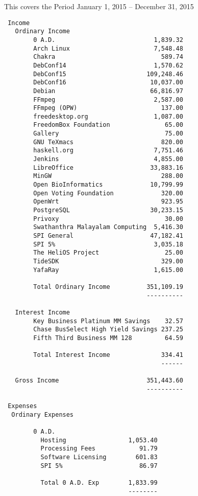 \documentclass[letterpaper]{report}
\begin{document}
This covers the Period January 1, 2015 -- December 31, 2015

\begin{verbatim}
 Income
   Ordinary Income
        0 A.D.                           1,839.32
        Arch Linux                       7,548.48
        Chakra                             589.74
        DebConf14                        1,570.62
        DebConf15                      109,248.46
        DebConf16                       10,037.00
        Debian                          66,816.97
        FFmpeg                           2,587.00
        FFmpeg (OPW)                       137.00
        freedesktop.org                  1,087.00
        FreedomBox Foundation               65.00
        Gallery                             75.00
        GNU TeXmacs                        820.00
        haskell.org                      7,751.46
        Jenkins                          4,855.00
        LibreOffice                     33,883.16
        MinGW                              288.00
        Open BioInformatics             10,799.99
        Open Voting Foundation             320.00
        OpenWrt                            923.95
        PostgreSQL                      30,233.15
        Privoxy                             30.00
        Swathanthra Malayalam Computing  5,416.30
        SPI General                     47,182.41
        SPI 5%                           3,035.18
        The HeliOS Project                  25.00
        TideSDK                            329.00
        YafaRay                          1,615.00

        Total Ordinary Income          351,109.19
                                       ----------

   Interest Income
        Key Business Platinum MM Savings    32.57
        Chase BusSelect High Yield Savings 237.25
        Fifth Third Business MM 128         64.59

        Total Interest Income              334.41
                                           ------

   Gross Income                        351,443.60
                                       ----------

 Expenses
  Ordinary Expenses

        0 A.D.
          Hosting                 1,053.40
          Processing Fees            91.79
          Software Licensing        601.83
          SPI 5%                     86.97

          Total 0 A.D. Exp        1,833.99
                                  --------


\end{verbatim}
\end{document}

